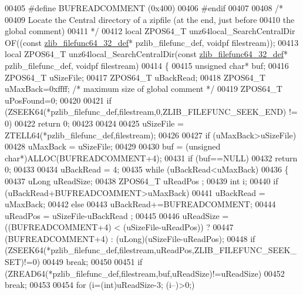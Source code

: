 \begin{DoxyCode}
00405 \textcolor{preprocessor}{#define BUFREADCOMMENT (0x400)}
00406 \textcolor{preprocessor}{#endif}
00407 
00408 \textcolor{comment}{/*}
00409 \textcolor{comment}{  Locate the Central directory of a zipfile (at the end, just before}
00410 \textcolor{comment}{    the global comment)}
00411 \textcolor{comment}{*/}
00412 local ZPOS64\_T unz64local\_SearchCentralDir OF((\textcolor{keyword}{const} \hyperlink{structzlib__filefunc64__32__def__s}{zlib\_filefunc64\_32\_def}* 
      pzlib\_filefunc\_def, voidpf filestream));
00413 local ZPOS64\_T unz64local\_SearchCentralDir(\textcolor{keyword}{const} \hyperlink{structzlib__filefunc64__32__def__s}{zlib\_filefunc64\_32\_def}* 
      pzlib\_filefunc\_def, voidpf filestream)
00414 \{
00415     \textcolor{keywordtype}{unsigned} \textcolor{keywordtype}{char}* buf;
00416     ZPOS64\_T uSizeFile;
00417     ZPOS64\_T uBackRead;
00418     ZPOS64\_T uMaxBack=0xffff; \textcolor{comment}{/* maximum size of global comment */}
00419     ZPOS64\_T uPosFound=0;
00420 
00421     \textcolor{keywordflow}{if} (ZSEEK64(*pzlib\_filefunc\_def,filestream,0,ZLIB\_FILEFUNC\_SEEK\_END) != 0)
00422         \textcolor{keywordflow}{return} 0;
00423 
00424 
00425     uSizeFile = ZTELL64(*pzlib\_filefunc\_def,filestream);
00426 
00427     \textcolor{keywordflow}{if} (uMaxBack>uSizeFile)
00428         uMaxBack = uSizeFile;
00429 
00430     buf = (\textcolor{keywordtype}{unsigned} \textcolor{keywordtype}{char}*)ALLOC(BUFREADCOMMENT+4);
00431     \textcolor{keywordflow}{if} (buf==NULL)
00432         \textcolor{keywordflow}{return} 0;
00433 
00434     uBackRead = 4;
00435     \textcolor{keywordflow}{while} (uBackRead<uMaxBack)
00436     \{
00437         uLong uReadSize;
00438         ZPOS64\_T uReadPos ;
00439         \textcolor{keywordtype}{int} i;
00440         \textcolor{keywordflow}{if} (uBackRead+BUFREADCOMMENT>uMaxBack)
00441             uBackRead = uMaxBack;
00442         \textcolor{keywordflow}{else}
00443             uBackRead+=BUFREADCOMMENT;
00444         uReadPos = uSizeFile-uBackRead ;
00445 
00446         uReadSize = ((BUFREADCOMMENT+4) < (uSizeFile-uReadPos)) ?
00447                      (BUFREADCOMMENT+4) : (uLong)(uSizeFile-uReadPos);
00448         \textcolor{keywordflow}{if} (ZSEEK64(*pzlib\_filefunc\_def,filestream,uReadPos,ZLIB\_FILEFUNC\_SEEK\_SET)!=0)
00449             \textcolor{keywordflow}{break};
00450 
00451         \textcolor{keywordflow}{if} (ZREAD64(*pzlib\_filefunc\_def,filestream,buf,uReadSize)!=uReadSize)
00452             \textcolor{keywordflow}{break};
00453 
00454         \textcolor{keywordflow}{for} (i=(\textcolor{keywordtype}{int})uReadSize-3; (i--)>0;)

\end{DoxyCode}
